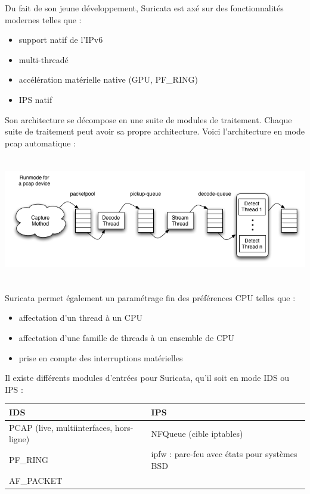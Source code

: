 \documentclass[a4paper,11pt,french]{article}
\begin{document}
Du fait de son jeune développement, Suricata est axé sur des fonctionnalités modernes telles que :
\begin{itemize}
\item support natif de l’IPv6
\item multi-threadé
\item accélération matérielle native (GPU, PF\_RING)
\item IPS natif
\end{itemize}
\newpage
Son architecture se décompose en une suite de modules de traitement. Chaque suite de traitement peut avoir sa propre architecture. Voici l’architecture en mode pcap automatique :
\begin{center}
\includegraphics[height=5.5cm]{icons/suricata_pcap_auto_pipeline_v1.png}
\end{center}

Suricata permet également un paramétrage fin des préférences CPU telles que :
\begin{itemize}
\item affectation d’un thread à un CPU
\item affectation d’une famille de threads à un ensemble de CPU
\item prise en compte des interruptions matérielles
\end{itemize}

Il existe différents modules d’entrées pour Suricata, qu’il soit en mode IDS ou IPS :

\begin{center}
\begin{tabularx}{16cm}{|X|X|}
\hline
\textbf{IDS}&\textbf{IPS}\\
\hline
PCAP (live, multiinterfaces, hors-ligne)  & NFQueue (cible iptables)\\
PF\_RING & ipfw : pare-feu avec états pour systèmes BSD\\
AF\_PACKET & \\
\hline
\end{tabularx}
\end{center}
\end{document}
